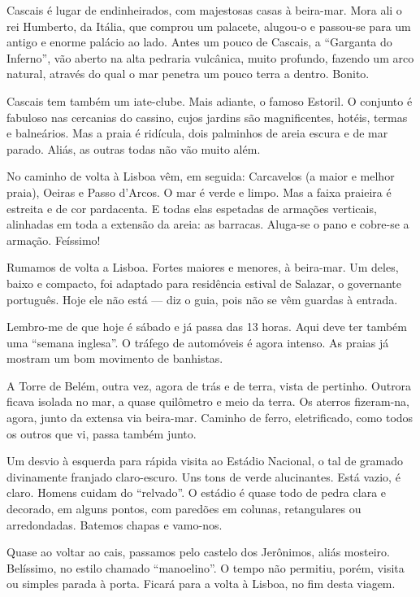 Cascais é lugar de endinheirados, com majestosas casas à beira-mar. Mora ali o rei Humberto, da Itália, que comprou um palacete, alugou-o e passou-se para um antigo e enorme palácio ao lado. Antes um pouco de Cascais, a ``Garganta do Inferno'', vão aberto na alta pedraria vulcânica, muito profundo, fazendo um arco natural, através do qual o mar penetra um pouco terra a dentro. Bonito.

Cascais tem também um iate-clube. Mais adiante, o famoso Estoril. O conjunto é fabuloso nas cercanias do cassino, cujos jardins são magnificentes, hotéis, termas e balneários. Mas a praia é ridícula, dois palminhos de areia escura e de mar parado. Aliás, as outras todas não vão muito além.

No caminho de volta à Lisboa vêm, em seguida: Carcavelos (a maior e melhor praia), Oeiras e Passo d’Arcos. O mar é verde e limpo. Mas a faixa praieira é estreita e de cor pardacenta. E todas elas espetadas de armações verticais, alinhadas em toda a extensão da areia: as barracas. Aluga-se o pano e cobre-se a armação. Feíssimo!

Rumamos de volta a Lisboa. Fortes maiores e menores, à beira-mar. Um deles, baixo e compacto, foi adaptado para residência estival de Salazar, o governante português. Hoje ele não está --- diz o guia, pois não se vêm guardas à entrada.

Lembro-me de que hoje é sábado e já passa das 13 horas. Aqui deve ter também uma ``semana inglesa''. O tráfego de automóveis é agora intenso. As praias já mostram um bom movimento de banhistas.

A Torre de Belém, outra vez, agora de trás e de terra, vista de pertinho. Outrora ficava isolada no mar, a quase quilômetro e meio da terra. Os aterros fizeram-na, agora, junto da extensa via beira-mar. Caminho de ferro, eletrificado, como todos os outros que vi, passa também junto.

Um desvio à esquerda para rápida visita ao Estádio Nacional, o tal de gramado divinamente franjado claro-escuro. Uns tons de verde alucinantes. Está vazio, é claro. Homens cuidam do ``relvado''. O estádio é quase todo de pedra clara e decorado, em alguns pontos, com paredões em colunas, retangulares ou arredondadas. Batemos chapas e vamo-nos.

Quase ao voltar ao cais, passamos pelo castelo dos Jerônimos, aliás mosteiro. Belíssimo, no estilo chamado ``manoelino''. O tempo não permitiu, porém, visita ou simples parada à porta. Ficará para a volta à Lisboa, no fim desta viagem.

